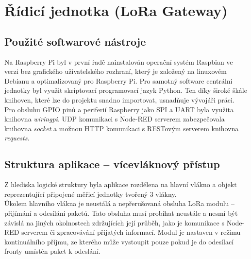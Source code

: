     


   
 
\section{Řídicí jednotka (LoRa Gateway)}
\subsection{Použité softwarové nástroje}
    Na Raspberry Pi byl v první řadě nainstalován operační systém Raspbian  ve verzi bez grafického uživatelského rozhraní, který je založený na linuxovém Debianu a optimalizovaný pro Raspberry Pi. Pro samotný software centrální jednotky byl využit skriptovací programovací jazyk Python. Ten díky široké škále knihoven, které lze do projektu snadno importovat, usnadňuje vývojáři práci.\\
    Pro obsluhu GPIO pinů a periferií Raspberry jako SPI a UART byla využita knihovna \textit{wiringpi}.
    UDP komunikaci s Node-RED serverem zabezpečovala knihovna \textit{socket} a možnou HTTP komunikaci s RESTovým serverem knihovna \textit{requests}.
  
\subsection{Struktura aplikace – vícevláknový přístup}
    Z hlediska logické struktury byla aplikace rozdělena na hlavní vlákno a objekt reprezentující připojené měřicí jednotky tvořený 3 vlákny.\\
    Úkolem hlavního vlákna je neustálá a nepřerušovaná obsluha LoRa modulu – přijímání a odesílání paketů. Tato obsluha musí probíhat neustále a nesmí být závislá na jiných okolnostech zdržujících její průběh, jako je komunikace s Node-RED serverem či zpracovávání přijatých informací. Modul je nastaven v režimu kontinuálního příjmu, ze kterého může vystoupit pouze pokud je do odesílací fronty umístěn paket k odeslání.
    
